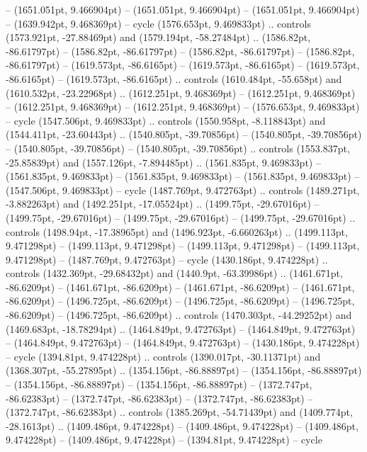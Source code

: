  -- (1651.051pt, 9.466904pt)
 -- (1651.051pt, 9.466904pt)
 -- (1651.051pt, 9.466904pt)
 -- (1639.942pt, 9.468369pt) -- cycle
(1576.653pt, 9.469833pt) .. controls (1573.921pt, -27.88469pt) and (1579.194pt, -58.27484pt) .. (1586.82pt, -86.61797pt)
 -- (1586.82pt, -86.61797pt)
 -- (1586.82pt, -86.61797pt)
 -- (1586.82pt, -86.61797pt)
 -- (1619.573pt, -86.6165pt)
 -- (1619.573pt, -86.6165pt)
 -- (1619.573pt, -86.6165pt)
 -- (1619.573pt, -86.6165pt) .. controls (1610.484pt, -55.658pt) and (1610.532pt, -23.22968pt) .. (1612.251pt, 9.468369pt)
 -- (1612.251pt, 9.468369pt)
 -- (1612.251pt, 9.468369pt)
 -- (1612.251pt, 9.468369pt)
 -- (1576.653pt, 9.469833pt) -- cycle
(1547.506pt, 9.469833pt) .. controls (1550.958pt, -8.118843pt) and (1544.411pt, -23.60443pt) .. (1540.805pt, -39.70856pt)
 -- (1540.805pt, -39.70856pt)
 -- (1540.805pt, -39.70856pt)
 -- (1540.805pt, -39.70856pt) .. controls (1553.837pt, -25.85839pt) and (1557.126pt, -7.894485pt) .. (1561.835pt, 9.469833pt)
 -- (1561.835pt, 9.469833pt)
 -- (1561.835pt, 9.469833pt)
 -- (1561.835pt, 9.469833pt)
 -- (1547.506pt, 9.469833pt) -- cycle
(1487.769pt, 9.472763pt) .. controls (1489.271pt, -3.882263pt) and (1492.251pt, -17.05524pt) .. (1499.75pt, -29.67016pt)
 -- (1499.75pt, -29.67016pt)
 -- (1499.75pt, -29.67016pt)
 -- (1499.75pt, -29.67016pt) .. controls (1498.94pt, -17.38965pt) and (1496.923pt, -6.660263pt) .. (1499.113pt, 9.471298pt)
 -- (1499.113pt, 9.471298pt)
 -- (1499.113pt, 9.471298pt)
 -- (1499.113pt, 9.471298pt)
 -- (1487.769pt, 9.472763pt) -- cycle
(1430.186pt, 9.474228pt) .. controls (1432.369pt, -29.68432pt) and (1440.9pt, -63.39986pt) .. (1461.671pt, -86.6209pt)
 -- (1461.671pt, -86.6209pt)
 -- (1461.671pt, -86.6209pt)
 -- (1461.671pt, -86.6209pt)
 -- (1496.725pt, -86.6209pt)
 -- (1496.725pt, -86.6209pt)
 -- (1496.725pt, -86.6209pt)
 -- (1496.725pt, -86.6209pt) .. controls (1470.303pt, -44.29252pt) and (1469.683pt, -18.78294pt) .. (1464.849pt, 9.472763pt)
 -- (1464.849pt, 9.472763pt)
 -- (1464.849pt, 9.472763pt)
 -- (1464.849pt, 9.472763pt)
 -- (1430.186pt, 9.474228pt) -- cycle
(1394.81pt, 9.474228pt) .. controls (1390.017pt, -30.11371pt) and (1368.307pt, -55.27895pt) .. (1354.156pt, -86.88897pt)
 -- (1354.156pt, -86.88897pt)
 -- (1354.156pt, -86.88897pt)
 -- (1354.156pt, -86.88897pt)
 -- (1372.747pt, -86.62383pt)
 -- (1372.747pt, -86.62383pt)
 -- (1372.747pt, -86.62383pt)
 -- (1372.747pt, -86.62383pt) .. controls (1385.269pt, -54.71439pt) and (1409.774pt, -28.1613pt) .. (1409.486pt, 9.474228pt)
 -- (1409.486pt, 9.474228pt)
 -- (1409.486pt, 9.474228pt)
 -- (1409.486pt, 9.474228pt)
 -- (1394.81pt, 9.474228pt) -- cycle
